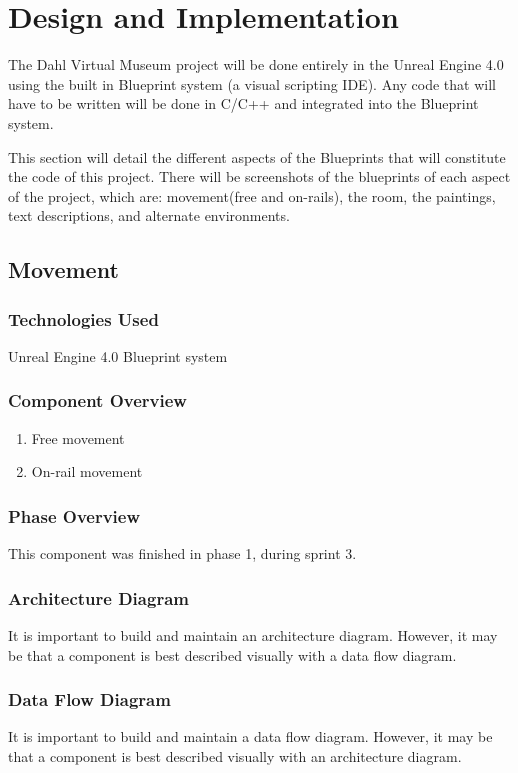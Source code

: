 
\chapter{Design  and Implementation}
The Dahl Virtual Museum project will be done entirely in the Unreal Engine 4.0 using the built in Blueprint system (a visual scripting IDE).  Any code that will have to be written will be done in C/C++ and integrated into the Blueprint system.  

This section will detail the different aspects of the Blueprints that will constitute the code of this project.  There will be screenshots of the blueprints of each aspect of the project, which are: movement(free and on-rails), the room, the paintings, text descriptions, and alternate environments. 
 

\section{Movement }

\subsection{Technologies  Used}
Unreal Engine 4.0 Blueprint system

\subsection{Component  Overview}
\begin{enumerate}
\item Free movement
\item On-rail movement
\end{enumerate}

\subsection{Phase Overview}
This component was finished in phase 1, during sprint 3. 

\subsection{ Architecture  Diagram}
It is important to build and maintain an architecture diagram.  However, it may 
be that a component is best described visually with a data flow diagram. 


\subsection{Data Flow Diagram}
It is important to build and maintain a data flow diagram.  However, it may be 
that a component is best described visually with an architecture diagram. 


